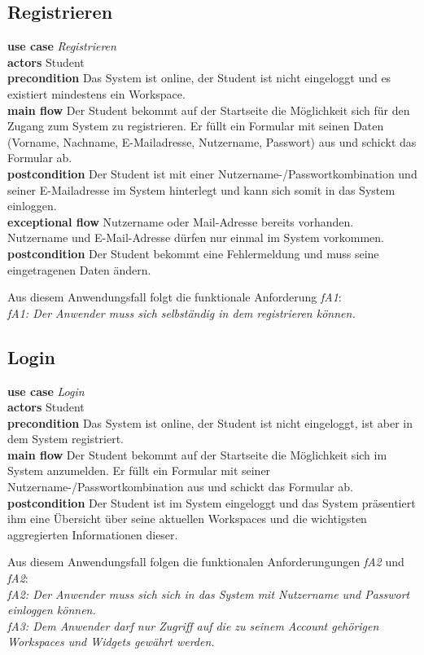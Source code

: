\subsection{Registrieren}
\textbf{use case} \emph{Registrieren}\\
\textbf{actors} Student\\
\textbf{precondition} Das System ist online, der Student ist nicht eingeloggt und es existiert mindestens ein Workspace.\\
\textbf{main flow} Der Student bekommt auf der Startseite die Möglichkeit sich für den Zugang zum System zu registrieren. Er füllt ein Formular mit seinen Daten (Vorname, Nachname, E-Mailadresse, Nutzername, Passwort) aus und schickt das Formular ab.\\
\textbf{postcondition} Der Student ist mit einer Nutzername-/Passwortkombination und seiner E-Mailadresse im System hinterlegt und kann sich somit in das System einloggen.\\
\textbf{exceptional flow} Nutzername oder Mail-Adresse bereits vorhanden. Nutzername und E-Mail-Adresse dürfen nur einmal im System vorkommen.\\
\textbf{postcondition} Der Student bekommt eine Fehlermeldung und muss seine eingetragenen Daten ändern.
 
Aus diesem Anwendungsfall folgt die funktionale Anforderung \emph{fA1}:\\
\emph{fA1: Der Anwender muss sich selbständig in dem registrieren können.}
 
\subsection{Login}
\textbf{use case} \emph{Login}\\
\textbf{actors} Student\\
\textbf{precondition} Das System ist online, der Student ist nicht eingeloggt, ist aber in dem System registriert.\\
\textbf{main flow} Der Student bekommt auf der Startseite die Möglichkeit sich im System anzumelden. Er füllt ein Formular mit seiner Nutzername-/Passwortkombination aus und schickt das Formular ab.\\
\textbf{postcondition} Der Student ist im System eingeloggt und das System präsentiert ihm eine Übersicht über seine aktuellen Workspaces und die wichtigsten aggregierten Informationen dieser.
 
Aus diesem Anwendungsfall folgen die funktionalen Anforderungungen \emph{fA2} und \emph{fA2}:\\
\emph{fA2: Der Anwender muss sich sich in das System mit Nutzername und Passwort einloggen können.}\\
\emph{fA3: Dem Anwender darf nur Zugriff auf die zu seinem Account gehörigen Workspaces und Widgets gewährt werden.}
 
